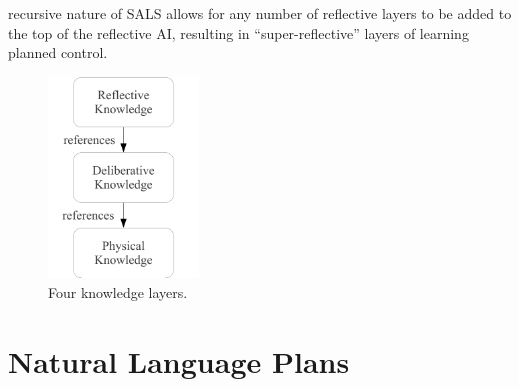 recursive nature of SALS allows for any number of reflective layers to
be added to the top of the reflective AI, resulting in
``super-reflective'' layers of learning planned control.
\begin{figure}
  \center
  \includegraphics[width=4cm]{gfx/four_knowledge_layers}
  \caption{Four knowledge layers.}
  \label{figure:four_knowledge_layers}
\end{figure}

\section{Natural Language Plans}

